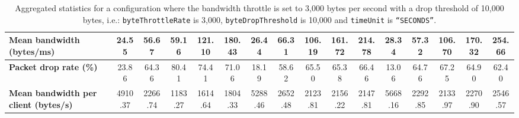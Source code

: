 \begin{table}[!h]
{\begin{tabular}{|l|ccccc|ccccc|ccccc|}
            \textbf{Mean bandwidth (bytes/ms)} & \multicolumn{1}{c|}{24.55} & \multicolumn{1}{c|}{56.67}
            & \multicolumn{1}{c|}{59.16}
            & \multicolumn{1}{c|}{121.10}
            & \multicolumn{1}{c|}{180.43}
            & \multicolumn{1}{c|}{26.44}
            & \multicolumn{1}{c|}{66.31}
            & \multicolumn{1}{c|}{106.19}
            & \multicolumn{1}{c|}{161.72}
            & \multicolumn{1}{c|}{214.78}
            & \multicolumn{1}{c|}{28.34}
            & \multicolumn{1}{c|}{57.32}
            & \multicolumn{1}{c|}{106.70}
            & \multicolumn{1}{c|}{170.32}
            & \multicolumn{1}{c|}{254.66}
            \\ \hline
            \textbf{Packet drop rate (\%)} & \multicolumn{1}{c|}{23.86} & \multicolumn{1}{c|}{64.36}
            & \multicolumn{1}{c|}{80.41}
            & \multicolumn{1}{c|}{74.41}
            & \multicolumn{1}{c|}{71.06}
            & \multicolumn{1}{c|}{18.19}
            & \multicolumn{1}{c|}{58.62}
            & \multicolumn{1}{c|}{65.50}
            & \multicolumn{1}{c|}{65.38}
            & \multicolumn{1}{c|}{66.46}
            & \multicolumn{1}{c|}{13.06}
            & \multicolumn{1}{c|}{64.76}
            & \multicolumn{1}{c|}{67.25}
            & \multicolumn{1}{c|}{64.90}
            & \multicolumn{1}{c|}{62.40}
            \\ \hline
            \textbf{Mean bandwidth per client (bytes/s)} & \multicolumn{1}{c|}{4910.37} & \multicolumn{1}{c|}{2266.74}
            & \multicolumn{1}{c|}{1183.27}
            & \multicolumn{1}{c|}{1614.64}
            & \multicolumn{1}{c|}{1804.33}
            & \multicolumn{1}{c|}{5288.46}
            & \multicolumn{1}{c|}{2652.48}
            & \multicolumn{1}{c|}{2123.81}
            & \multicolumn{1}{c|}{2156.22}
            & \multicolumn{1}{c|}{2147.81}
            & \multicolumn{1}{c|}{5668.16}
            & \multicolumn{1}{c|}{2292.85}
            & \multicolumn{1}{c|}{2133.97}
            & \multicolumn{1}{c|}{2270.90}
            & \multicolumn{1}{c|}{2546.57}
            \\ \hline
        \end{tabular}
    }
    \caption{Aggregated statistics for a configuration where the bandwidth throttle is set to 3,000 bytes per second
    with a drop threshold of 10,000 bytes, i.e.: \texttt{byteThrottleRate} is 3,000, \texttt{byteDropThreshold} is
    10,000 and \texttt{timeUnit} is \texttt{``SECONDS''}.}
    \label{table:analysis_results_throttle}
\end{table}

